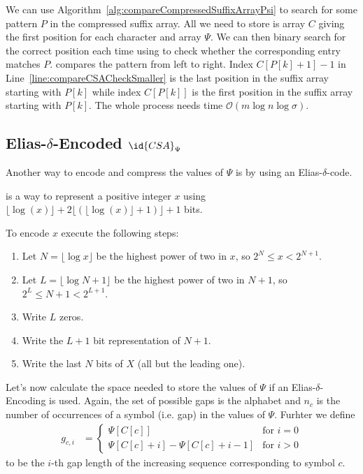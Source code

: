 We can use Algorithm~\ref{alg:compareCompressedSuffixArrayPsi} to search for some pattern $P$ in the compressed suffix array. All we need to store is array $C$ giving the first position for each character and array $\Psi$. We can then binary search for the correct position each time using  to check whether the corresponding entry matches $P$.  compares the pattern from left to right. Index $C[P[k] + 1] - 1$ in Line~\ref{line:compareCSACheckSmaller} is the last position in the suffix array starting with $P[k]$ while index $C[P[k]]$ is the first position in the suffix array starting with $P[k]$. The whole process needs time $\mathcal{O}(m\log n \log \sigma)$.

\subsection{Elias-$\delta$-Encoded $\id{CSA}_\Psi$}

Another way to encode and compress the values of $\Psi$ is by using an Elias-$\delta$-code.

\begin{Definition}
  \label{def:eliasDeltaEncoding}
   is a way to represent a positive integer $x$ using $\lfloor\log (x)\rfloor+2\lfloor(\lfloor\log (x)\rfloor + 1)\rfloor+1$ bits.

  To encode $x$ execute the following steps:
  \begin{enumerate}
    \item Let $N = \lfloor \log x \rfloor$ be the highest power of two in $x$, so $2^N \leq x < 2^{N+1}$.
    \item Let $L = \lfloor \log N + 1 \rfloor$ be the highest power of two in $N+1$, so $2^L \leq N+1 < 2^{L + 1}$.
    \item Write $L$ zeros.
    \item Write the $L+1$ bit representation of $N+1$.
    \item Write the last $N$ bits of $X$ (all but the leading one).
  \end{enumerate}
\end{Definition}

Let's now calculate the space needed to store the values of $\Psi$ if an Elias-$\delta$-Encoding is used. Again, the set of possible gaps is the alphabet and $n_c$ is the number of occurrences of a symbol (i.e. gap) in the values of $\Psi$. Furhter we define
\begin{align}
  g_{c,i} &=
  \begin{cases}
    \Psi[C[c]] & \text{for $i = 0$} \\  
    \Psi[C[c] + i] - \Psi[C[c] + i - 1] & \text{for $i > 0$}
  \end{cases}
\end{align}
to be the $i$-th gap length of the increasing sequence corresponding to symbol $c$.

